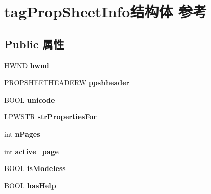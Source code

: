 \hypertarget{structtag_prop_sheet_info}{}\section{tag\+Prop\+Sheet\+Info结构体 参考}
\label{structtag_prop_sheet_info}
\subsection*{Public 属性}
\begin{DoxyCompactItemize}
\item 
\mbox{\label{structtag_prop_sheet_info_abe4bdbe6e70cf6cdd0e5eccf5af5706b}} 
\hyperlink{interfacevoid}{H\+W\+ND} {\bfseries hwnd}
\item 
\mbox{\label{structtag_prop_sheet_info_abae69aed367313bf43fd04bc7072f0c7}} 
\hyperlink{struct___p_r_o_p_s_h_e_e_t_h_e_a_d_e_r_w}{P\+R\+O\+P\+S\+H\+E\+E\+T\+H\+E\+A\+D\+E\+RW} {\bfseries ppshheader}
\item 
\mbox{\label{structtag_prop_sheet_info_a1aa1e3b6d8334ab73f0f209c5be0daad}} 
B\+O\+OL {\bfseries unicode}
\item 
\mbox{\label{structtag_prop_sheet_info_a6f2a5efcc371367d93178e1138fedc2c}} 
L\+P\+W\+S\+TR {\bfseries str\+Properties\+For}
\item 
\mbox{\label{structtag_prop_sheet_info_a86c367076ae9b8f4a57cedecd2b73fdd}} 
int {\bfseries n\+Pages}
\item 
\mbox{\label{structtag_prop_sheet_info_a63af9f35cb4e2aed9912a0ebbb8e06fb}} 
int {\bfseries active\+\_\+page}
\item 
\mbox{\label{structtag_prop_sheet_info_a2f9a702ca51c0e77520e30c735a1fdc9}} 
B\+O\+OL {\bfseries is\+Modeless}
\item 
\mbox{\label{structtag_prop_sheet_info_a075cc823a78248db058b0663e740514f}} 
B\+O\+OL {\bfseries has\+Help}
\item 
\mbox{\label{structtag_prop_sheet_info_ac362ecd0039737fbba67427249580e58}} 

\end{DoxyCompactItemize}
